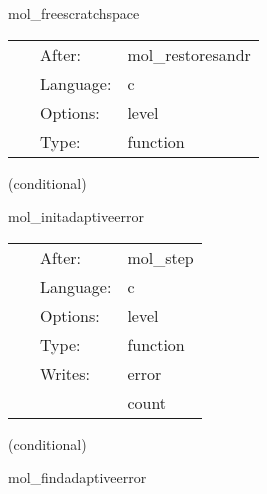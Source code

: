 \vspace{5mm}


\hspace{5mm} mol\_freescratchspace 

\hspace{5mm}{\it free storage for scratch levels } 


\hspace{5mm}

 \begin{tabular*}{160mm}{cll} 
~ & After:  & mol\_restoresandr \\ 
~ & Language:  & c \\ 
~ & Options:  & level \\ 
~ & Type:  & function \\ 
\end{tabular*} 


\vspace{5mm}

   (conditional) 

\hspace{5mm} mol\_initadaptiveerror 

\hspace{5mm}{\it control the step size: initialize error check variables } 


\hspace{5mm}

 \begin{tabular*}{160mm}{cll} 
~ & After:  & mol\_step \\ 
~ & Language:  & c \\ 
~ & Options:  & level \\ 
~ & Type:  & function \\ 
~ & Writes:  & error \\ 
~& ~ &count\\ 
\end{tabular*} 


\vspace{5mm}

   (conditional) 

\hspace{5mm} mol\_findadaptiveerror 

\hspace{5mm}{\it control the step size: compute error check variables } 


\hspace{5mm}

